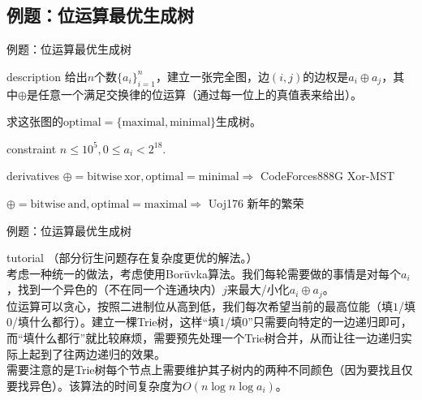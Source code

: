 \documentclass{beamer}
\begin{document}
\subsection{例题：位运算最优生成树}
\begin{frame}{例题：位运算最优生成树}
	\begin{block}{description}
		给出$n$个数$\{a_i\}_{i=1}^{n}$，建立一张完全图，边$(i, j)$的边权是$a_i \oplus a_j$，其中$\oplus$是任意一个满足交换律的位运算（通过每一位上的真值表来给出）。
		
		求这张图的$\mathrm{optimal = \{maximal, minimal\}}$生成树。
	\end{block}
	\begin{block}{constraint}
		$n \le 10^5, 0 \le a_i < 2^{18}.$
	\end{block}
	\begin{block}{derivatives}
		$\oplus = \mathrm{bitwise\ xor}, \mathrm{optimal = minimal} \Rightarrow $ CodeForces888G Xor-MST
		
		$\oplus = \mathrm{bitwise\ and}, \mathrm{optimal = maximal} \Rightarrow $ Uoj176 新年的繁荣
	\end{block}
\end{frame}
\begin{frame}{例题：位运算最优生成树}
	\begin{block}{tutorial}
		（部分衍生问题存在复杂度更优的解法。）\\
		
		考虑一种统一的做法，考虑使用Borüvka算法。我们每轮需要做的事情是对每个$a_i$，找到一个异色的（不在同一个连通块内）$j$来最大/小化$a_i \oplus a_j$。\\
		
		位运算可以贪心，按照二进制位从高到低，我们每次希望当前的最高位能（填$1$/填$0$/填什么都行）。建立一棵Trie树，这样“填$1$/填$0$”只需要向特定的一边递归即可，而“填什么都行”就比较麻烦，需要预先处理一个Trie树合并，从而让往一边递归实际上起到了往两边递归的效果。\\
		
		需要注意的是Trie树每个节点上需要维护其子树内的两种不同颜色（因为要找且仅要找异色）。该算法的时间复杂度为$O(n\log n\log a_i)$。
	\end{block}
\end{frame}
\end{document}
